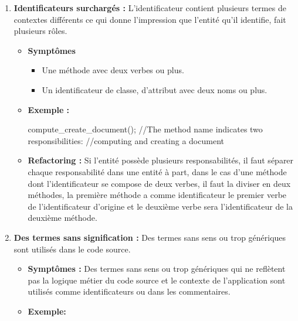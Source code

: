 \begin{enumerate}
\begin{itemize}
\begin{framed}
{class Examlpe \{...  \}  // l and p are reversed \newline
 class Abbrvt \{ ...\} // uncommon abbreviation for Abbreviation\newline
 }
 \end{framed}
\item \textbf {Refactoring :}
Utiliser un correcteur automatique pour voir ses propositions des mots au fur et à mesure de l’écriture de code, pour éviter ce lexicon bad smell.
\end{itemize}
\item \textbf {Identificateurs surchargés :}
L’identificateur contient plusieurs termes de contextes différents ce qui donne l’impression que l’entité qu’il identifie, fait plusieurs rôles.
\begin{itemize}
\item \textbf {Symptômes}
\begin{itemize}
\item Une méthode avec deux verbes ou plus.
\item Un identificateur de classe, d’attribut  avec deux noms ou plus.
\end{itemize}
\item \textbf {Exemple :}
\begin{framed}
    {\selectfont

compute\_create\_document();\newline
 //The method name indicates two responsibilities:\newline
 //computing and creating a document\newline
}
\end{framed}
\item \textbf {Refactoring :}
Si l’entité possède plusieurs responsabilités, il faut séparer chaque responsabilité dans une entité à part, dans le cas d’une méthode dont l’identificateur se compose de deux verbes, il faut la diviser en deux méthodes, la première méthode a comme  identificateur le premier  verbe de l’identificateur d’origine et le deuxième verbe sera l’identificateur de la deuxième méthode.
\end{itemize}
\item \textbf {Des termes sans signification :}
Des termes sans sens ou trop génériques sont utilisés dans le code source.
\begin{itemize}
\item \textbf {Symptômes :}
Des termes sans sens ou trop génériques qui ne reflètent pas la logique métier du code source et le contexte de l'application sont utilisés comme identificateurs ou dans les commentaires.
\item \textbf {Exemple:}
\begin{framed}
   

\end{framed}
\end{itemize}
\end{enumerate}
